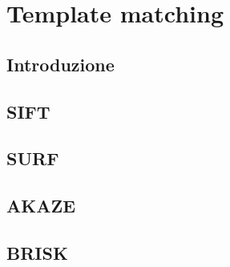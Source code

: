\chapter{Template matching}
\label{template-matching}

\section{Introduzione}
\section{SIFT}
\section{SURF}
\section{AKAZE}
\section{BRISK}

